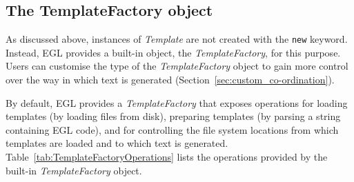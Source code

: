 \subsection{The TemplateFactory object}
As discussed above, instances of \emph{Template} are not created with the \texttt{new} keyword. Instead, EGL provides a built-in object, the \emph{TemplateFactory}, for this purpose. Users can customise the type of the \emph{TemplateFactory} object to gain more control over the way in which text is generated (Section~\ref{sec:custom_co-ordination}).

By default, EGL provides a \emph{TemplateFactory} that exposes operations for loading templates (by loading files from disk), preparing templates (by parsing a string containing EGL code), and for controlling the file system locations from which templates are loaded and to which text is generated. Table~\ref{tab:TemplateFactoryOperations} lists the operations provided by the built-in \emph{TemplateFactory} object. 


